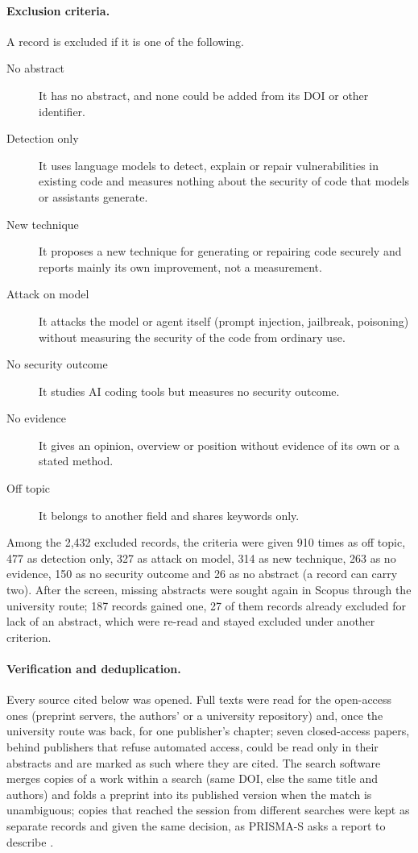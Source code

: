 \paragraph{Exclusion criteria.}
A record is excluded if it is one of the following.
\begin{description}
  \item[No abstract] It has no abstract, and none could be added from its
    DOI or other identifier.
  \item[Detection only] It uses language models to detect, explain or
    repair vulnerabilities in existing code and measures nothing about the
    security of code that models or assistants generate.
  \item[New technique] It proposes a new technique for generating or
    repairing code securely and reports mainly its own improvement, not a
    measurement.
  \item[Attack on model] It attacks the model or agent itself (prompt
    injection, jailbreak, poisoning) without measuring the security of the
    code from ordinary use.
  \item[No security outcome] It studies AI coding tools but measures no
    security outcome.
  \item[No evidence] It gives an opinion, overview or position without
    evidence of its own or a stated method.
  \item[Off topic] It belongs to another field and shares keywords only.
\end{description}
Among the 2,432 excluded records, the criteria were given 910 times as off
topic, 477 as detection only, 327 as attack on model, 314 as new technique,
263 as no evidence, 150 as no security outcome and 26 as no abstract (a
record can carry two).
After the screen, missing abstracts were sought again in Scopus through the
university route; 187 records gained one, 27 of them records already
excluded for lack of an abstract, which were re-read and stayed excluded
under another criterion.

\paragraph{Verification and deduplication.}
Every source cited below was opened.
Full texts were read for the open-access ones (preprint servers, the
authors' or a university repository) and, once the university route was
back, for one publisher's chapter; seven closed-access papers, behind
publishers that refuse automated access, could be read only in their
abstracts and are marked as such where they are cited.
The search software merges copies of a work within a search (same DOI, else the same
title and authors) and folds a preprint into its published version when the
match is unambiguous; copies that reached the session from different
searches were kept as separate records and given the same decision, as
PRISMA-S asks a report to describe \autocite{Rethlefsen2021PRISMAS}.

